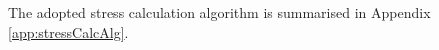 \documentclass[sn-mathphys,Numbered]{sn-jnl}%
\begin{document}
The adopted stress calculation algorithm \citep{de_souza_neto_computational_2008} is summarised in Appendix \ref{app:stressCalcAlg}. %







%
%
%
\end{document}
